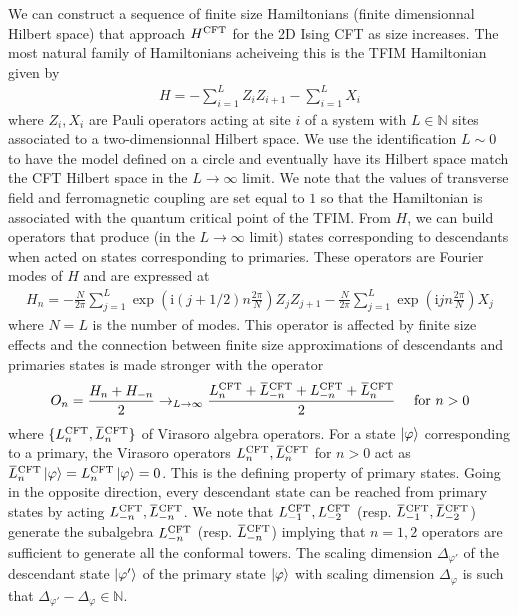 \documentclass[10pt, a4paper]{article}
\begin{document}
{\begin{enumerate}
  We can construct a sequence of finite size Hamiltonians (finite dimensionnal Hilbert space) that approach $H^{\rm CFT}$ for the 2D Ising CFT as size increases. The most natural family of Hamiltonians acheiveing this is the TFIM Hamiltonian given by 
  \begin{align*}
    H=-\sum_{i=1}^L Z_i Z_{i+1}-\sum_{i=1}^L X_i
  \end{align*}
  where $Z_i, X_i$ are Pauli operators acting at site $i$ of a system with $L \in \mathbb{N}$ sites associated to a two-dimensionnal Hilbert space. We use the identification $L \sim 0$ to have the model defined on a circle and eventually have its Hilbert space match the CFT Hilbert space in the $L \to \infty$ limit. We note that the values of transverse field and ferromagnetic coupling are set equal to $1$ so that the Hamiltonian is associated with the quantum critical point of the TFIM. From $H$, we can build operators that produce (in the $L \to \infty$ limit) states corresponding to descendants when acted on states corresponding to primaries. These operators are Fourier modes of $H$ and are expressed at 
  \begin{align*}
    H_n = -\frac{N}{2 \pi} \sum_{j=1}^L \exp \left(\mathrm{i}(j+1 / 2) n \frac{2 \pi}{N}\right) Z_j Z_{j+1}-\frac{N}{2 \pi} \sum_{j=1}^L \exp \left(\mathrm{i} j n \frac{2 \pi}{N}\right) X_j
  \end{align*}
  where $N = L$ is the number of modes. This operator is affected by finite size effects and the connection between finite size approximations of descendants and primaries states is made stronger with the operator 
  \begin{align*}
    O_n=\frac{H_n+H_{-n}}{2} \to_{L\to \infty} \frac{L_n^{\rm C F T}+\bar{L}_{-n}^{\rm C F T}+L_{-n}^{\rm C F T}+\bar{L}_n^{\rm C F T}}{2} \quad \text { for } n>0
  \end{align*}
  where $\{L_n^{\rm CFT}, \bar{L}_{n}^{\rm CFT}\}$ of Virasoro algebra operators. For a state $\ket{\varphi}$ corresponding to a primary, the Virasoro operators $L_{n}^{\rm CFT}, \bar{L}_{n}^{\rm CFT}$ for $n > 0$ act as $\bar{L}_{n}^{\rm CFT} \ket{\varphi} = L_{n}^{\rm CFT} \ket{\varphi} = 0$. This is the defining property of primary states. Going in the opposite direction, every descendant state can be reached from primary states by acting $L_{-n}^{\rm CFT}, \bar{L}_{-n}^{\rm CFT}$. We note that $L_{-1}^{\rm CFT}, L_{-2}^{\rm CFT}$ (resp. $\bar{L}_{-1}^{\rm CFT}, \bar{L}_{-2}^{\rm CFT}$) generate the subalgebra $L_{-n}^{\rm CFT}$ (resp. $\bar{L}_{-n}^{\rm CFT}$) implying that $n=1, 2$ operators are sufficient to generate all the conformal towers. The scaling dimension $\Delta_{\varphi'}$ of the descendant state $\ket{\varphi'}$ of the primary state $\ket{\varphi}$ with scaling dimension $\Delta_\varphi$ is such that $\Delta_{\varphi'} - \Delta_\varphi \in \mathbb{N}$. \\
  

\end{enumerate}}
\end{document}
